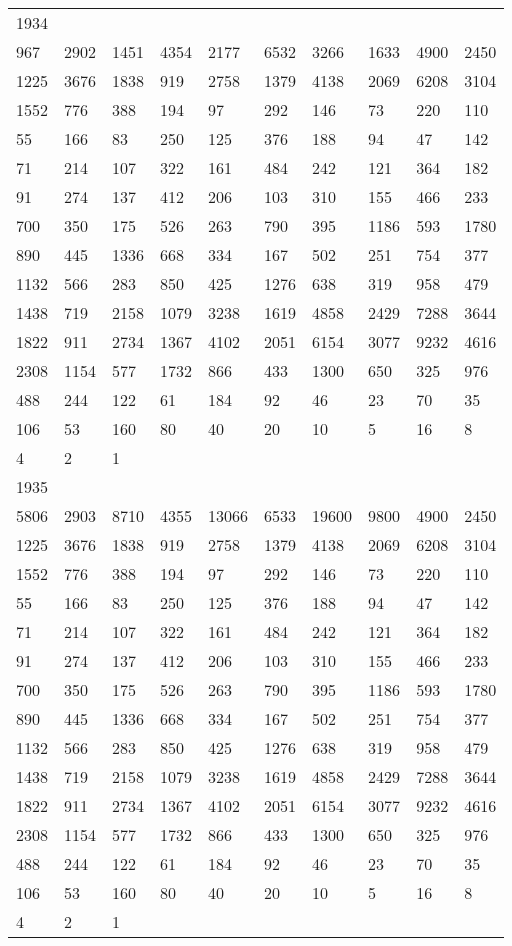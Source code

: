 \begin{longtable}{*{10}{l}}
1934&&&&&&&&&\\
967& 2902& 1451& 4354& 2177& 6532& 3266& 1633& 4900& 2450\\
1225& 3676& 1838& 919& 2758& 1379& 4138& 2069& 6208& 3104\\
1552& 776& 388& 194& 97& 292& 146& 73& 220& 110\\
55& 166& 83& 250& 125& 376& 188& 94& 47& 142\\
71& 214& 107& 322& 161& 484& 242& 121& 364& 182\\
91& 274& 137& 412& 206& 103& 310& 155& 466& 233\\
700& 350& 175& 526& 263& 790& 395& 1186& 593& 1780\\
890& 445& 1336& 668& 334& 167& 502& 251& 754& 377\\
1132& 566& 283& 850& 425& 1276& 638& 319& 958& 479\\
1438& 719& 2158& 1079& 3238& 1619& 4858& 2429& 7288& 3644\\
1822& 911& 2734& 1367& 4102& 2051& 6154& 3077& 9232& 4616\\
2308& 1154& 577& 1732& 866& 433& 1300& 650& 325& 976\\
488& 244& 122& 61& 184& 92& 46& 23& 70& 35\\
106& 53& 160& 80& 40& 20& 10& 5& 16& 8\\
4& 2& 1& \\

1935&&&&&&&&&\\
5806& 2903& 8710& 4355& 13066& 6533& 19600& 9800& 4900& 2450\\
1225& 3676& 1838& 919& 2758& 1379& 4138& 2069& 6208& 3104\\
1552& 776& 388& 194& 97& 292& 146& 73& 220& 110\\
55& 166& 83& 250& 125& 376& 188& 94& 47& 142\\
71& 214& 107& 322& 161& 484& 242& 121& 364& 182\\
91& 274& 137& 412& 206& 103& 310& 155& 466& 233\\
700& 350& 175& 526& 263& 790& 395& 1186& 593& 1780\\
890& 445& 1336& 668& 334& 167& 502& 251& 754& 377\\
1132& 566& 283& 850& 425& 1276& 638& 319& 958& 479\\
1438& 719& 2158& 1079& 3238& 1619& 4858& 2429& 7288& 3644\\
1822& 911& 2734& 1367& 4102& 2051& 6154& 3077& 9232& 4616\\
2308& 1154& 577& 1732& 866& 433& 1300& 650& 325& 976\\
488& 244& 122& 61& 184& 92& 46& 23& 70& 35\\
106& 53& 160& 80& 40& 20& 10& 5& 16& 8\\
4& 2& 1& \\


\end{longtable}
